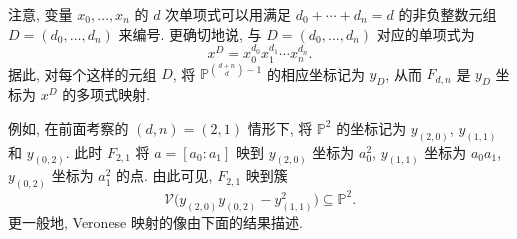 注意, 变量 $x_{0},\ldots,x_{n}$ 的 $d$ 次单项式可以用满足 $d_{0}+\cdots+d_{n}=d$ 的非负整数元组 $D=(d_{0},\ldots,d_{n})$ 来编号. 更确切地说, 与 $D=(d_{0},\ldots,d_{n})$ 对应的单项式为
\[
  x^{D}=x_{0}^{d_{0}}x_{1}^{d_{1}}\cdots x_{n}^{d_{n}}.
\]
据此, 对每个这样的元组 $D$, 将 $\mathbb{P}^{\binom{d+n}{d}-1}$ 的相应坐标记为 $y_{D}$, 从而 $F_{d,n}$ 是 $y_{D}$ 坐标为 $x^{D}$ 的多项式映射.

例如, 在前面考察的 $(d,n)=(2,1)$ 情形下, 将 $\mathbb{P}^{2}$ 的坐标记为 $y_{(2,0)}$, $y_{(1,1)}$ 和 $y_{(0,2)}$. 此时 $F_{2,1}$ 将 $a=[a_{0}:a_{1}]$ 映到 $y_{(2,0)}$ 坐标为 $a_{0}^{2}$, $y_{(1,1)}$ 坐标为 $a_{0}a_{1}$, $y_{(0,2)}$ 坐标为 $a_{1}^{2}$ 的点. 由此可见, $F_{2,1}$ 映到簇
\[
  \mathcal{V}\bigl(y_{(2,0)}y_{(0,2)}-y_{(1,1)}^{2}\bigr)\subseteq\mathbb{P}^{2}.
\]
更一般地, Veronese 映射的像由下面的结果描述.

